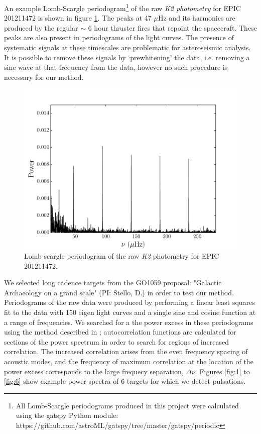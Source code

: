 \documentclass[useAMS, usenatbib]{aastex}
\begin{document}
An example Lomb-Scargle periodogram\footnote{All Lomb-Scargle periodograms
produced in this project were calculated using the gatspy Python module:
https://github.com/astroML/gatspy/tree/master/gatspy/periodic}
of the raw {\it K2 photometry} for EPIC 201211472 is shown in figure
\ref{fig:raw}.
The peaks at 47 $\mu$Hz and its harmonics are produced by the regular $\sim$
6 hour thruster fires that repoint the spacecraft.
These peaks are also present in periodograms of the \citet{Vanderburg2014}
light curves.
The presence of systematic signals at these timescales are problematic for
asteroseismic analysis.
It is possible to remove these signals by `prewhitening' the data, i.e.
removing a sine wave at that frequency from the data, however no such
procedure is necessary for our method.

\begin{figure}
\begin{center}
\includegraphics[width=6in, clip=true]{raw_201211472.pdf}
\caption{Lomb-scargle periodogram of the raw {\it K2} photometry for
	EPIC 201211472.}
\label{fig:raw}
\end{center}
\end{figure}

We selected long cadence targets from the GO1059 proposal: "Galactic
Archaeology on a grand scale" (PI: Stello, D.) in order to test our method.
Periodograms of the raw data were produced by performing a linear least
squares fit to the data with 150 eigen light curves and a single sine and
cosine function at a range of frequencies.
We searched for a the power excess in these periodograms using the method
described in \citet{Huber2009}; autocorrelation functions are calculated for
sections of the power spectrum in order to search for regions of increased
correlation.
The increased correlation arises from the even frequency spacing of acoustic
modes, and the frequency of maximum correlation at the location of the power
excess corresponds to the large frequecy separation, $\Delta\nu$.
Figures \ref{fig:1} to \ref{fig:6} show example power spectra of 6 targets for
which we detect pulsations.
\end{document}
